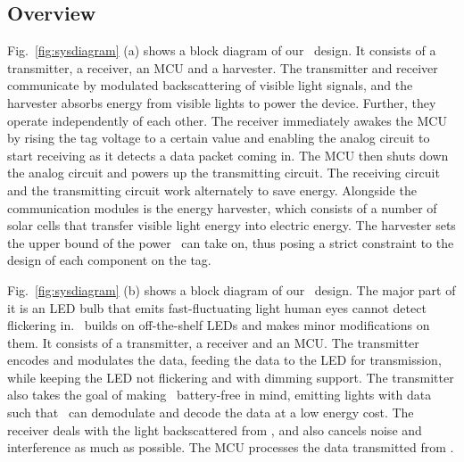 



\subsection{Overview}
Fig.~\ref{fig:sysdiagram} (a) shows a block diagram of our \vitag\ design. It consists of a transmitter, a receiver, an MCU and a harvester. The transmitter and receiver communicate by modulated backscattering of visible light signals, and the harvester absorbs energy from visible lights to power the device. Further, they operate independently of each other. The receiver immediately awakes the MCU by rising the tag voltage to a certain value and enabling the analog circuit to start receiving as it detects a data packet coming in. The MCU then shuts down the analog circuit and powers up the transmitting circuit. The receiving circuit and the transmitting circuit work alternately to save energy. Alongside the communication modules is the energy harvester, which consists of a number of solar cells that transfer visible light energy into electric energy. The harvester sets the upper bound of the power \vitag\ can take on, thus posing a strict constraint to the design of each component on the tag.

Fig.~\ref{fig:sysdiagram} (b) shows a block diagram of our \reader\ design. The major part of it is an LED bulb that emits fast-fluctuating light human eyes cannot detect flickering in. \reader\ builds on off-the-shelf LEDs and makes minor modifications on them. It consists of a transmitter, a receiver and an MCU. The transmitter encodes and modulates the data, feeding the data to the LED for transmission, while keeping the LED not flickering and with dimming support. The transmitter also takes the goal of making \vitag\ battery-free in mind, emitting lights with data such that \vitag\ can demodulate and decode the data at a low energy cost. The receiver deals with the light backscattered from \vitag, and also cancels noise and interference as much as possible. The MCU processes the data transmitted from \vitag.

